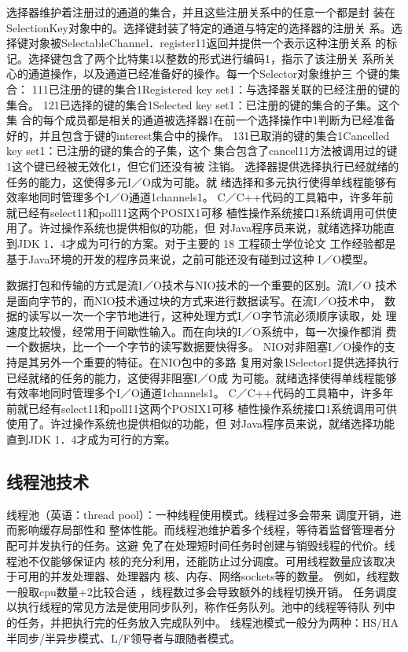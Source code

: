 选择器维护着注册过的通道的集合，并且这些注册关系中的任意一个都是封
装在SelectionKey对象中的。选择键封装了特定的通道与特定的选择器的注册关
系。选择键对象被SelectableChannel．register11返回并提供一个表示这种注册关系
的标记。选择键包含了两个比特集1以整数的形式进行编码1，指示了该注册关
系所关心的通道操作，以及通道已经准备好的操作。每一个Selector对象维护三
个键的集合：
111已注册的键的集合1Registered key set1：与选择器关联的已经注册的键的
集合。
121已选择的键的集合1Selected key set1：已注册的键的集合的子集。这个集
合的每个成员都是相关的通道被选择器1在前一个选择操作中1判断为已经准备
好的，并且包含于键的interest集合中的操作。
131已取消的键的集合1Cancelled key set1：已注册的键的集合的子集，这个
集合包含了cancel11方法被调用过的键1这个键已经被无效化1，但它们还没有被
注销。
选择器提供选择执行已经就绪的任务的能力，这使得多元I／O成为可能。就
绪选择和多元执行使得单线程能够有效率地同时管理多个I／O通道1channels1。
C／C++代码的工具箱中，许多年前就已经有select11和poll11这两个POSIX1可移
植性操作系统接口1系统调用可供使用了。许过操作系统也提供相似的功能，但
对Java程序员来说，就绪选择功能直到JDK 1．4才成为可行的方案。对于主要的
18
工程硕士学位论文
工作经验都是基于Java环境的开发的程序员来说，之前可能还没有碰到过这种
I／O模型。

数据打包和传输的方式是流I／O技术与NIO技术的一个重要的区别。流I／O
技术是面向字节的，而NIO技术通过块的方式来进行数据读写。在流I／O技术中，
数据的读写以一次一个字节地进行，这种处理方式I／O字节流必须顺序读取，处
理速度比较慢，经常用于间歇性输入。而在向块的I／O系统中，每一次操作都消
费一个数据块，比一个一个字节的读写数据要快得多。
NIO对非阻塞I／O操作的支持是其另外一个重要的特征。在NIO包中的多路
复用对象1Selector1提供选择执行已经就绪的任务的能力，这使得非阻塞I／O成
为可能。就绪选择使得单线程能够有效率地同时管理多个I／O通道1channels1。
C／C++代码的工具箱中，许多年前就已经有select11和poll11这两个POSIX1可移
植性操作系统接口1系统调用可供使用了。许过操作系统也提供相似的功能，但
对Java程序员来说，就绪选择功能直到JDK 1．4才成为可行的方案。
\subsection{线程池技术}
线程池（英语：thread pool）：一种线程使用模式。线程过多会带来
调度开销，进而影响缓存局部性和
整体性能。而线程池维护着多个线程，等待着监督管理者分配可并发执行的任务。这避
免了在处理短时间任务时创建与销毁线程的代价。线程池不仅能够保证内
核的充分利用，还能防止过分调度。可用线程数量应该取决于可用的并发处理器、处理器内
核、内存、网络sockets等的数量。 例如，线程数一般取cpu数量+2比较合适
，线程数过多会导致额外的线程切换开销。
任务调度以执行线程的常见方法是使用同步队列，称作任务队列。池中的线程等待队
列中的任务，并把执行完的任务放入完成队列中。
线程池模式一般分为两种：HS/HA半同步/半异步模式、L/F领导者与跟随者模式。

